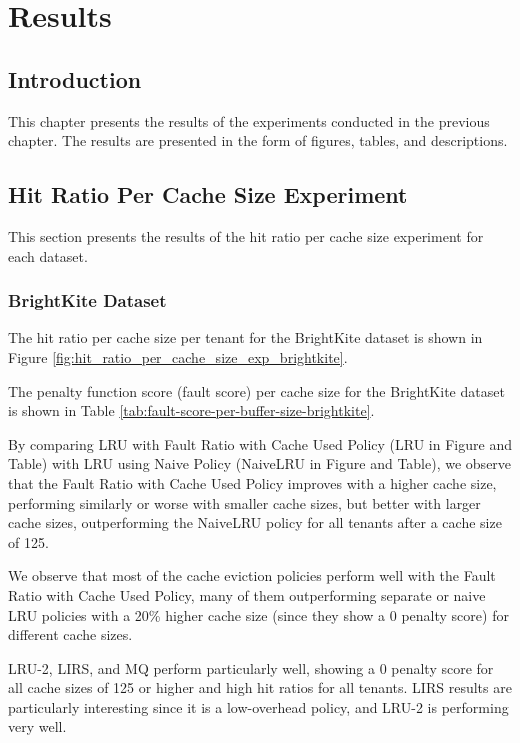 \chapter{Results}

\section{Introduction}

This chapter presents the results of the experiments conducted in the previous chapter. 
The results are presented in the form of figures, tables, and descriptions.

\section{Hit Ratio Per Cache Size Experiment}

This section presents the results of the hit ratio per cache size experiment for each dataset.

\subsection{BrightKite Dataset}

The hit ratio per cache size per tenant for the BrightKite dataset is shown in Figure 
\ref{fig:hit_ratio_per_cache_size_exp_brightkite}.

The penalty function score (fault score) per cache size for the BrightKite dataset 
is shown in Table \ref{tab:fault-score-per-buffer-size-brightkite}.

By comparing LRU with Fault Ratio with Cache Used Policy (LRU in Figure and Table) with LRU 
using Naive Policy (NaiveLRU in Figure and Table), we observe that the Fault Ratio with Cache 
Used Policy improves with a higher cache size, performing similarly or worse with smaller cache 
sizes, but better with larger cache sizes, outperforming the NaiveLRU policy for all tenants 
after a cache size of 125.

We observe that most of the cache eviction policies perform well with the Fault Ratio with 
Cache Used Policy, many of them outperforming separate or naive LRU policies with a 20\% 
higher cache size (since they show a 0 penalty score) for different cache sizes.

LRU-2, LIRS, and MQ perform particularly well, showing a 0 penalty score for all cache sizes of 
125 or higher and high hit ratios for all tenants. LIRS results are particularly interesting 
since it is a low-overhead policy, and LRU-2 is performing very well.

